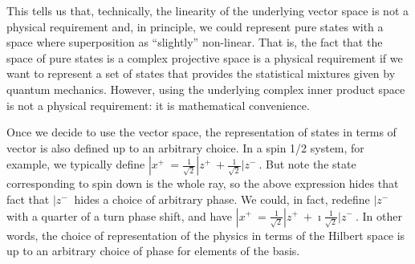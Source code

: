 This tells us that, technically, the linearity of the underlying vector space is not a physical requirement and, in principle, we could represent pure states with a space where superposition as ``slightly'' non-linear. That is, the fact that the space of pure states is a complex projective space is a physical requirement if we want to represent a set of states that provides the statistical mixtures given by quantum mechanics. However, using the underlying complex inner product space is not a physical requirement: it is mathematical convenience.

Once we decide to use the vector space, the representation of states in terms of vector is also defined up to an arbitrary choice. In a spin 1/2 system, for example, we typically define $|x^+\> = \frac{1}{\sqrt{2}} | z^+ \> + \frac{1}{\sqrt{2}} | z^- \>$. But note the state corresponding to spin down is the whole ray, so the above expression hides that fact that $|z^-\>$ hides a choice of arbitrary phase. We could, in fact, redefine $|z^-\>$ with a quarter of a turn phase shift, and have $|x^+\> = \frac{1}{\sqrt{2}} | z^+ \> + \imath \frac{1}{\sqrt{2}} | z^- \>$. In other words, the choice of representation of the physics in terms of the Hilbert space is up to an arbitrary choice of phase for elements of the basis.

